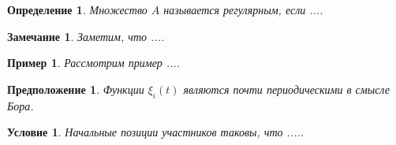 \documentclass[12pt,a4paper,twoside]{article}  %
\makeatletter
\renewcommand{\section}{\@startsection{section}{1}{0pt}{1.3ex
		plus 1ex minus .1ex}{1.3ex plus .1ex}{\bf\,\S\,}}
\newtheorem{df}{Определение}
\newtheorem{zam}{Замечание}
\newtheorem{pr}{Пример}
\newtheorem{assum}{Предположение}
\newtheorem{cond}{Условие}
\makeatother
\begin{document}
\begin{df} \label{dfpr}
Множество $A$ называется {\it регулярным}, если ....
\end{df}

\begin{zam} \label{zampr}
Заметим, что ....
\end{zam}

\begin{pr} \label{prpr}
Рассмотрим пример ....
\end{pr}

\begin{assum} \label{assumpr}
Функции $\xi_i(t)$ являются почти периодическими в смысле Бора.
\end{assum}

\begin{cond} \label{condpr}
Начальные позиции участников таковы, что .....
\end{cond}

\vspace{1ex}

\makeatletter
\@fundingrus\par
{}
\renewcommand{\section}{\@startsection{section}{1}{0pt}{1.3ex
plus 1ex minus 1ex}{1.3ex plus .1ex}{}}
\end{document}
